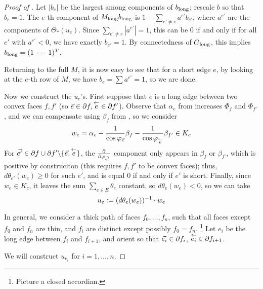 \begin{proof}[Proof of ]
Let $|b_e|$ be the largest among components of $b_{\text{long}}$;
rescale $b$ so that $b_e = 1$.
The $e$-th component of $M_{\text{long}} b_{\text{long}}$
is $1 - \sum_{e' \neq e} a^{e'} b_{e'}$,
where $a^{e'}$ are the components of $\Theta_*(u_e)$.
Since $\sum_{e' \neq e} |a^{e'}| = 1$, this can be 0 if and only if
for all $e'$ with $a^{e'} < 0$, we have exactly $b_{e'} = 1$.
By connectedness of $G_{\text{long}}$, this implies
$b_{\text{long}} = (1 \; \cdots \; 1)^T$.


Returning to the full $M$, it is now easy to see that
for a short edge $e$,
by looking at the $e$-th row of $M$,
we have $b_e = \sum a^{e'} = 1$,
so we are done.



Now we construct the $u_e$'s.
First suppose that $e$ is a long edge between two convex faces $f, f'$
(so $\vec{e} \in \partial f, \overset{\leftarrow}{e} \in \partial f'$).
Observe that $\alpha_e$ from 
increases $\Phi_f$ and $\Phi_{f'}$,
and we can compensate using $\beta_f$ from ,
so we consider
\[
w_e = \alpha_e - \frac{1}{\cos \varphi_{\vec{e}}} \beta_f
	- \frac{1}{\cos \varphi_{\overset{\leftarrow}{e}}} \beta_{f'} \in K_c
\]
For $\vec{e'} \in \partial f \cup \partial f' \backslash \{\vec{e},\overset{\leftarrow}{e}\}$,
the ${\frac{\partial}{\partial \varphi_{\vec{e'}}}}$ component only appears in $\beta_f$
or $\beta_{f'}$, which is positive by construciton
(this requires $f,f'$ to be convex faces);
thus, $d\theta_{e'}(w_e) \geq 0$ for such $e'$, and
is equal 0 if and only if $e'$ is short.
Finally, since $w_e \in K_c$, it leaves the sum $\sum_{e\in E} \theta_e$
constant, so $d\theta_e(w_e) < 0$, so we can take
\begin{equation}
\label{e:u_e}
u_e := (d\theta_e(w_e))^{-1} \cdot w_e
\end{equation}

In general, we consider a thick path of faces $f_0, \ldots, f_n$,
such that all faces except $f_0$ and $f_n$ are thin,
and $f_i$ are distinct except possibly $f_0 = f_n$.
\footnote{Picture a closed accordian.}
Let $e_i$ be the long edge between $f_i$ and $f_{i+1}$,
and orient so that $\vec{e_i} \in \partial f_i$, $\overset{\leftarrow}{e_i} \in \partial f_{i+1}$.


We will construct $u_{e_i}$ for $i = 1,\ldots,n$.



\end{proof}
